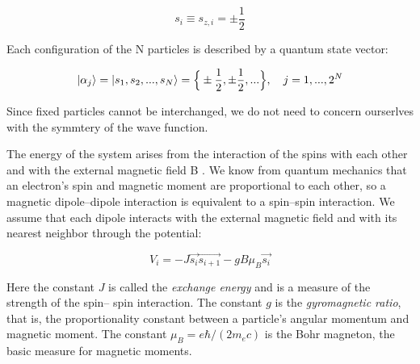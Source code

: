 \documentclass[12pt]{article}
\theoremstyle{plain}
\begin{document}
\vspace{2mm}

\begin{equation*}
    s_{i} \equiv s_{z, i} = \pm \frac{1}{2}
\end{equation*}

\vspace{2mm}

\par Each configuration of the N particles is described by a quantum state vector:

\vspace{2mm}

\begin{equation*}
    \ket{\alpha_{j}} = \ket{s_1, s_2, ..., s_N} = \Big\{ \pm \frac{1}{2}, \pm \frac{1}{2}, ...\Big\}, \quad j = 1, ..., 2^{N}
\end{equation*}

\vspace{2mm}

\par Since fixed particles cannot be interchanged, we do not need to concern
ourserlves with the symmtery of the wave function.

\vspace{2mm}

\par The energy of the system arises from the interaction of the spins with each other and
with the external magnetic field B . We know from quantum mechanics that an electron’s spin
and magnetic moment are proportional to each other, so a magnetic dipole–dipole interaction
is equivalent to a spin–spin interaction. We assume that each dipole interacts with the external
magnetic field and with its nearest neighbor through the potential:

\vspace{2mm}

\begin{equation*}
    V_{i} = -J\vec{s_{i}}\vec{s_{i+1}} - g B\mu_{B}\vec{s_i}
\end{equation*}

\vspace{2mm}

\par Here the constant $J$ is called the \textit{exchange energy} and is a measure of the strength of the spin–
spin interaction. The constant $g$ is the \textit{gyromagnetic ratio}, that is, the proportionality constant
between a particle’s angular momentum and magnetic moment. The constant $\mu_B = e\hbar / (2m_e c)$
is the Bohr magneton, the basic measure for magnetic moments.
\end{document}
